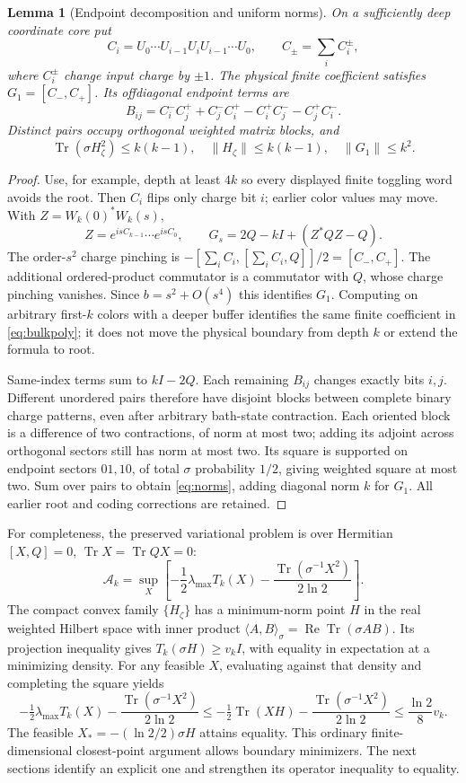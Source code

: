 \documentclass[11pt]{article}
\newtheorem{lemma}[theorem]{Lemma}
\newcommand{\Tr}{\operatorname{Tr}}
\newcommand{\norm}[1]{\lVert #1\rVert}
\begin{document}
\begin{lemma}[Endpoint decomposition and uniform norms]\label{lem:endpoints}
On a sufficiently deep coordinate core put
\[
 C_i=U_0\cdots U_{i-1}U_iU_{i-1}\cdots U_0,
 \qquad C_\pm=\sum_i C_i^\pm,
\]
where $C_i^\pm$ change input charge by $\pm1$.
The physical finite coefficient satisfies $G_1=[C_-,C_+]$.
Its offdiagonal endpoint terms are
\[
 B_{ij}=C_i^-C_j^++C_j^-C_i^+-C_i^+C_j^--C_j^+C_i^-.
\]
Distinct pairs occupy orthogonal weighted matrix blocks, and
\begin{equation}\label{eq:norms}
 \Tr(\sigma H_\zeta^2)\le k(k-1),\quad
 \norm{H_\zeta}\le k(k-1),\quad\norm{G_1}\le k^2.
\end{equation}
\end{lemma}
\begin{proof}
Use, for example, depth at least $4k$ so every displayed finite toggling
word avoids the root. Then $C_i$ flips only charge bit $i$; earlier
color values may move. With $Z=W_k(0)^*W_k(s)$,
\[
 Z=e^{isC_{k-1}}\cdots e^{isC_0},\qquad
 G_s=2Q-kI+(Z^*QZ-Q).
\]
The order-$s^2$ charge pinching is
$-[\sum_iC_i,[\sum_iC_i,Q]]/2=[C_-,C_+]$.
The additional ordered-product commutator is a commutator with $Q$,
whose charge pinching vanishes. Since $b=s^2+O(s^4)$ this identifies
$G_1$. Computing on arbitrary first-$k$ colors with a deeper buffer
identifies the same finite coefficient in \eqref{eq:bulkpoly}; it does
not move the physical boundary from depth $k$ or extend the formula to root.

Same-index terms sum to $kI-2Q$. Each remaining $B_{ij}$ changes exactly
bits $i,j$. Different unordered pairs therefore have disjoint blocks
between complete binary charge patterns, even after arbitrary bath-state
contraction. Each oriented block is a difference of two contractions,
of norm at most two; adding its adjoint across orthogonal sectors still
has norm at most two. Its square is supported on endpoint sectors $01,10$,
of total $\sigma$ probability $1/2$, giving weighted square at most two.
Sum over pairs to obtain \eqref{eq:norms}, adding diagonal norm $k$ for
$G_1$. All earlier root and coding corrections are retained.
\end{proof}

For completeness, the preserved variational problem is over Hermitian
$[X,Q]=0$, $\Tr X=\Tr QX=0$:
\[
 \mathcal A_k=\sup_X\left[-\frac12\lambda_{\max}T_k(X)
               -\frac{\Tr(\sigma^{-1}X^2)}{2\ln2}\right].
\]
The compact convex family $\{H_\zeta\}$ has a minimum-norm point $H$
in the real weighted Hilbert space with inner product
$\langle A,B\rangle_\sigma=\operatorname{Re}\Tr(\sigma AB)$.
Its projection inequality gives $T_k(\sigma H)\ge v_kI$, with equality
in expectation at a minimizing density. For any feasible $X$, evaluating
against that density and completing the square yields
\[
 -\tfrac12\lambda_{\max}T_k(X)
 -\frac{\Tr(\sigma^{-1}X^2)}{2\ln2}
 \le-\tfrac12\Tr(XH)-\frac{\Tr(\sigma^{-1}X^2)}{2\ln2}
 \le\frac{\ln2}{8}v_k.
\]
The feasible $X_*=-(\ln2/2)\sigma H$ attains equality. This ordinary
finite-dimensional closest-point argument allows boundary minimizers.
The next sections identify an explicit one and strengthen its operator
inequality to equality.
\end{document}
